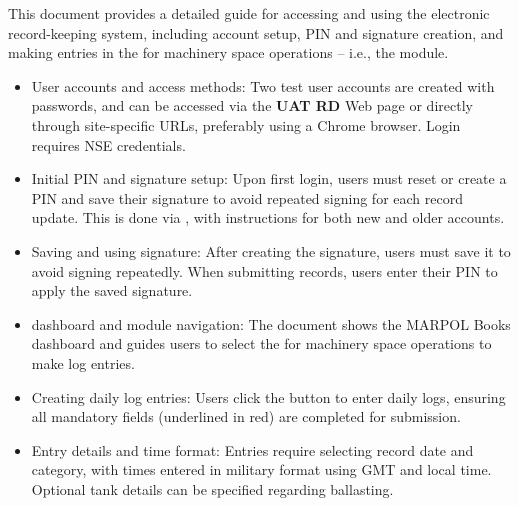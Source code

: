 \documentclass[11pt, twoside]{article}
\begin{document}
{\fontsize{11}{14}\selectfont

\vspace*{23pt}


\vspace*{32pt}

This document provides a detailed guide for accessing and using the \eLogs{} electronic record-keeping system, including account setup, PIN and signature creation, 
and making entries in the  for 
machinery space operations -- i.e., the  module.

\vspace*{6pt}

\begin{itemize}[itemsep=13pt, leftmargin=21pt, labelsep=13pt, 
label=\cbull{}]

\item{} User accounts and access methods: Two test user accounts are created with passwords, and \eLogs{} can be accessed via the \textbf{UAT RD} Web page or directly through site-specific URLs, preferably using a Chrome browser. Login requires NSE credentials. 

\item{} Initial PIN and signature setup: Upon first login, users must reset or create a PIN and save their signature to avoid repeated signing for each record update. This is done via 
, with instructions for both new and older accounts. 

\item{} Saving and using signature: After creating the signature, users must save it to avoid signing repeatedly. When submitting records, users enter their PIN to apply the saved signature. 

\item{} \eLogs{} dashboard and module navigation: The document shows the MARPOL Books dashboard and guides users to select the  for machinery space operations to make log entries. 

\item{} Creating daily log entries: Users click the \CreatePlus{} button to enter daily logs, ensuring all mandatory fields (underlined in red) are completed for submission. 

\item{} Entry details and time format: Entries require selecting record date and category, with times entered in military format using GMT and local time. Optional tank details can be specified regarding ballasting. 


\end{itemize}}
\end{document}
